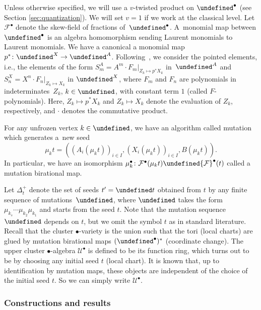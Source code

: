 \documentclass[10pt,a4paper]{amsart}
\newcommand{\opname}[1]{\operatorname{\mathsf{#1}}}
\newcommand{\cF}{{\mathcal F}}
\newcommand{\cT}{{\mathcal T}}
\newcommand{\cU}{{\mathcal U}}
\newcommand{\ufv}{\opname{uf}}
\let\isom\undefined
\let\Iufv\undefined
\let\LP\undefined
\let\seq\undefined
\newcommand{\isom}{\stackrel{\sim}{\rightarrow}}
\newcommand{\Iufv}{I_{\ufv}}
\newcommand{\LP}{{\mathcal{LP}}}
\newcommand{\seq}{\boldsymbol{\mu}}%
\numberwithin{equation}{section}
\begin{document}
Unless otherwise specified, we will use a $v$-twisted product on $\LP^\bullet$ (see Section \ref{sec:quantization}). We will set $v=1$ if we work at the classical level. Let $\cF^{\bullet}$ denote the skew-field of fractions of~$\LP^{\bullet}$. A~monomial map between $\LP^\bullet$ is an algebra
homomorphism sending Laurent monomials to Laurent monomials. We have a canonical
a monomial map $p^{*}\colon\LP^{X}\rightarrow\LP^{A}$. Following~\mbox{\cite{Qin12, qin2017triangular}}, we consider
the pointed elements, i.e., the elements of the form $S_{m}^{A}=A^{m}\cdot F_{m}|_{Z_{k}\mapsto p^{*}X_{k}}$
in~$\LP^{A}$ and~$S_{n}^{X}=X^{n}\cdot F_{n}|_{Z_{k}\mapsto X_{k}}$
in $\LP^{X}$, where $F_{m}$ and $F_{n}$ are polynomials in indeterminates~$Z_{k}$, ${k\in\Iufv}$, with constant term $1$ (called $F$-polynomials).
Here, $Z_{k}\mapsto p^{*}X_{k}$ and $Z_{k}\mapsto X_{k}$ denote
the evaluation of $Z_{k}$, respectively, and $\cdot$ denotes the commutative product.

For any unfrozen vertex $k\in\Iufv$, we have an algorithm called
mutation which generates a~new seed \[\mu_{k}t=((A_{i}(\mu_{k}t))_{i\in I},(X_{i}(\mu_{k}t))_{i\in I},B(\mu_{k}t)).\]
In particular, we have an isomorphism $\mu_{k}^{\bullet}\colon \cF^{\bullet}(\mu_{k}t)\isom\cF^{\bullet}(t)$
called a mutation birational map.

Let $\Delta_{t}^{+}$ denote the set of seeds $t'=\seq t$ obtained
from $t$ by any finite sequence of mutations~$\seq$, where $\seq$ takes the form $\mu_{k_s}\cdots\mu_{k_2}\mu_{k_1}$ and starts from the seed $t$. Note that the mutation sequence $\seq$ depends on $t$, but we omit the symbol $t$ as in standard literature. Recall that
the cluster $\bullet$-variety is the union \smash{$\cup_{t'\in\Delta_{t}^{+}}\cT^{\bullet}(t')$}
such that the tori (local charts) are glued by mutation birational
maps $(\seq^{\bullet})^{*}$ (coordinate change). The upper cluster
$\bullet$-algebra $\mathcal{U}^{\bullet}$ is defined to be its function
ring, which turns out to be \smash{$\mathcal{U}^{\bullet}(t)=\cap_{t'\in\Delta_{t}^{+}}\seq^{*}\LP^{\bullet}(t')$}
by choosing any initial seed $t$ (local chart). It is known that,
up to identification by mutation maps, these objects are independent
of the choice of the initial seed $t$. So we can simply write $\cU^{\bullet}$.

\subsubsection*{Constructions and results}
\end{document}
